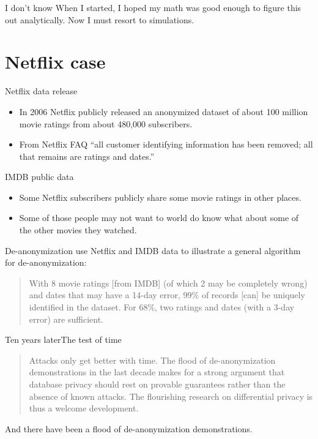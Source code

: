 \documentclass[xcolor={dvipsnames,table,hyperref}]{beamer}
\begin{document}
\begin{frame}{I don't know}
  When I started, I hoped my math was good enough to figure this out analytically. Now I must resort to simulations.
\end{frame}

\appendix

\section{Netflix case}
\begin{frame}{Netflix data release}
  \begin{itemize}
    \item In 2006 Netflix publicly released an anonymized dataset of about 100 million movie ratings from about 480,000 subscribers.
    \item From Netflix FAQ “all customer identifying information has been removed; all that remains are ratings and dates.”
  \end{itemize}
\end{frame}

\begin{frame}{IMDB public data}
  \begin{itemize}
    \item Some Netflix subscribers publicly share some movie ratings in other places.
    \item Some of those people may not want to world do know what about some of the other movies they watched.
  \end{itemize}
\end{frame}

\begin{frame}{De-anonymization}
  \Textcite{narayanan2008robust} use Netflix and IMDB data to illustrate a general algorithm for de-anonymization:

  \begin{quotation}
    With 8 movie ratings [from IMDB] (of which 2 may be completely wrong) and dates that may have a 14-day error, 99\% of records [can] be uniquely identified in the dataset. For 68\%, two ratings and dates (with a 3-day error) are sufficient.
  \end{quotation}

\end{frame}

\begin{frame}{Ten years later}{The test of time}

  \begin{quote}
    Attacks only get better with time. The flood of de-ano\-nym\-i\-za\-tion demonstrations in the last decade makes for a strong argument that database privacy should rest on provable guarantees rather than the absence of known attacks. The flourishing research on differential privacy is thus a welcome development. \parencite[p.~1]{narayanan2019robust}
  \end{quote}

  And there have been a flood of de-anonymization demonstrations.

\end{frame}
\end{document}
